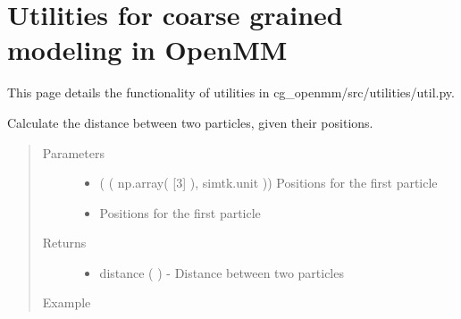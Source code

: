 \documentclass[letterpaper,12pt,english,openany,oneside]{sphinxmanual}
\begin{document}
\chapter{Utilities for coarse grained modeling in OpenMM}
\label{\detokenize{utilities:utilities-for-coarse-grained-modeling-in-openmm}}\label{\detokenize{utilities::doc}}
This page details the functionality of utilities in cg\_openmm/src/utilities/util.py.

\label{\detokenize{utilities:module-utilities.util}}

\begin{fulllineitems}
\label{\detokenize{utilities:utilities.util.distance}}
Calculate the distance between two particles, given their positions.
\begin{quote}\begin{description}
\item[{Parameters}] \leavevmode\begin{itemize}
\item {} 
 ( ( np.array( {[}3{]} ), simtk.unit )) \textendash{} Positions for the first particle

\item {} 
 \textendash{} Positions for the first particle

\end{itemize}

\item[{Returns}] \leavevmode
\begin{itemize}
\item {} 
distance ( ) - Distance between two particles

\end{itemize}


\item[{Example}] \leavevmode
\end{description}\end{quote}


\end{fulllineitems}
\end{document}
